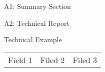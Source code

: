 \documentclass{article}
\begin{document}
\begin{reportSection}{A1: Summary Section}



\end{reportSection}

\pagebreak

\pagestyle{ending}

\begin{reportSection}{A2: Technical Report}

\begin{reportBox}{Technical Example}
\end{reportBox}

\end{reportSection}
\pagebreak

\begin{tabular}{|p{}|p{}|p{}|}
\hline
Field 1 & Filed 2 & Filed 3
\end{tabular}
\end{document}
